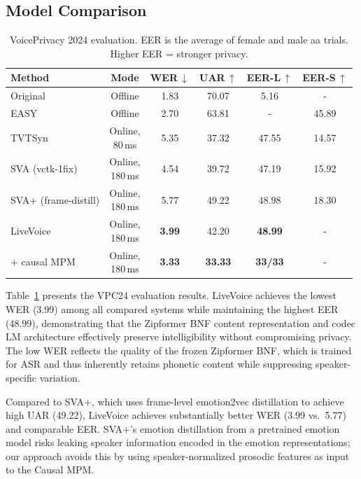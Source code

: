 \documentclass{article}
\begin{document}
\subsection{Model Comparison}
\label{ssec:modelcomp}

\begin{table}[t]
\centering
\caption{VoicePrivacy 2024 evaluation. EER is the average of female and male aa trials. Higher EER = stronger privacy.}
\label{tab:vpc24}
\smallskip
{\footnotesize
\begin{tabular}{@{}lccccc@{}}
\toprule
\textbf{Method} & \textbf{Mode} & \textbf{WER}\,$\downarrow$ & \textbf{UAR}\,$\uparrow$ & \textbf{EER-L}\,$\uparrow$ & \textbf{EER-S}\,$\uparrow$\\
\midrule
Original & Offline & 1.83 & 70.07 & 5.16 & - \\
\midrule
EASY & Offline & 2.70 & 63.81 & - & 45.89 \\
\midrule

TVTSyn & \shortstack{Online,\\80\,ms} & 5.35 & 37.32 & 47.55 & 14.57 \\
SVA (vctk-1fix) & \shortstack{Online,\\180\,ms} & 4.54 & 39.72 & 47.19 & 15.92 \\
SVA+ (frame-distill) & \shortstack{Online,\\180\,ms} & 5.77 & 49.22 & 48.98 & 18.30\\
\midrule
LiveVoice & \shortstack{Online,\\180\,ms} & \textbf{3.99} & 42.20 & \textbf{48.99} & - \\
\quad + causal MPM & \shortstack{Online,\\180\,ms} & \textbf{3.33} & \textbf{33.33} & \textbf{33/33} & -\\
\bottomrule
\end{tabular}}
\end{table}

Table~\ref{tab:vpc24} presents the VPC24 evaluation results.
LiveVoice achieves the lowest WER (3.99) among all compared systems while maintaining the highest EER (48.99), demonstrating that the Zipformer BNF content representation and codec LM architecture effectively preserve intelligibility without compromising privacy.
The low WER reflects the quality of the frozen Zipformer BNF, which is trained for ASR and thus inherently retains phonetic content while suppressing speaker-specific variation.

Compared to SVA+, which uses frame-level emotion2vec distillation to achieve high UAR (49.22), LiveVoice achieves substantially better WER (3.99 vs.\ 5.77) and comparable EER.
SVA+'s emotion distillation from a pretrained emotion model risks leaking speaker information encoded in the emotion representations; our approach avoids this by using speaker-normalized prosodic features as input to the Causal MPM.
\end{document}
